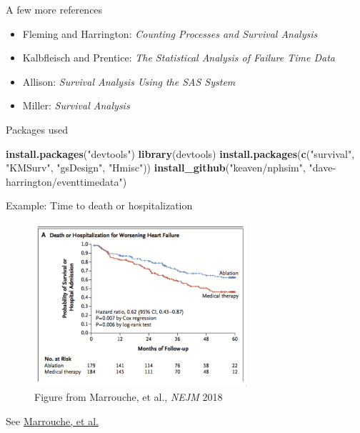 \documentclass[ignorenonframetext,]{beamer}
\newenvironment{Shaded}{\begin{snugshade}}{\end{snugshade}}
\newcommand{\KeywordTok}[1]{\textcolor[rgb]{0.13,0.29,0.53}{\textbf{#1}}}
\newcommand{\NormalTok}[1]{#1}
\newcommand{\StringTok}[1]{\textcolor[rgb]{0.31,0.60,0.02}{#1}}
\providecommand{\tightlist}{%
  \setlength{\itemsep}{0pt}\setlength{\parskip}{0pt}}
\begin{document}
\begin{frame}{%
\protect\hypertarget{a-few-more-references}{%
A few more references}}

\begin{itemize}
\tightlist
\item
  Fleming and Harrington: \emph{Counting Processes and Survival
  Analysis}
\item
  Kalbfleisch and Prentice: \emph{The Statistical Analysis of Failure
  Time Data}
\item
  Allison: \emph{Survival Analysis Using the SAS System}
\item
  Miller: \emph{Survival Analysis}
\end{itemize}

\end{frame}

\begin{frame}[fragile]{%
\protect\hypertarget{packages-used}{%
Packages used}}

\begin{Shaded}
\begin{Highlighting}[]
\KeywordTok{install.packages}\NormalTok{(}\StringTok{"devtools"}\NormalTok{)}
\KeywordTok{library}\NormalTok{(devtools)}
\KeywordTok{install.packages}\NormalTok{(}\KeywordTok{c}\NormalTok{(}\StringTok{"survival"}\NormalTok{, }\StringTok{"KMSurv"}\NormalTok{,}
                   \StringTok{"gsDesign"}\NormalTok{, }\StringTok{"Hmisc"}\NormalTok{))}
\KeywordTok{install_github}\NormalTok{(}\StringTok{"keaven/nphsim"}\NormalTok{, }\StringTok{"dave-harrington/eventtimedata"}\NormalTok{)}
\end{Highlighting}
\end{Shaded}

\end{frame}

\begin{frame}{%
\protect\hypertarget{example-time-to-death-or-hospitalization}{%
Example: Time to death or hospitalization}}

\begin{figure}
\centering
\includegraphics[width=0.7\textwidth,height=\textheight]{../figures/atrial_fib_death_hosp.pdf}
\caption{Figure from Marrouche, et al., \emph{NEJM} 2018}
\end{figure}

See
\href{../../clinical_papers/catheter_ablation_atrial_fib.pdf}{Marrouche,
et al.}

\end{frame}
\end{document}
